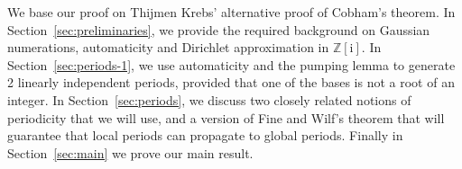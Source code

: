 \documentclass{amsart}
\newcommand{\Z}{\mathbb{Z}}
\newcommand{\tcb}{\textcolor{blue}}
\newcommand{\ii}{\mathrm{i}}
\newtheorem*{main theorem}{Theorem \ref{thm:main-gaussian}}
\theoremstyle{definition}
\begin{document}
% 



We base our proof  on Thijmen Krebs' alternative proof of Cobham's theorem\cite{Krebs}. In Section~\ref{sec:preliminaries}, we provide the required background on Gaussian numerations, automaticity and Dirichlet approximation in $\Z[\ii]$. In Section~\ref{sec:periods-1}, we use automaticity and the pumping lemma to generate 2 linearly independent periods, provided that one of  the bases is not a root of an integer. In Section~\ref{sec:periods}, we discuss two closely related notions of periodicity that we will use, and a version of Fine and Wilf's theorem that will guarantee that local periods can propagate to global periods. Finally in Section~\ref{sec:main} we prove our main result. 


\end{document}
